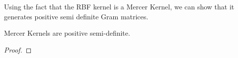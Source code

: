 %
%    
%    
%    
%
%
%
%

Using the fact that the RBF kernel is a Mercer Kernel, we can show that it generates positive semi definite Gram matrices.
\begin{lemma}
    Mercer Kernels are positive semi-definite.
\end{lemma}
\begin{proof}

\end{proof}

